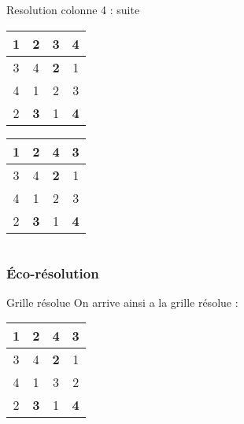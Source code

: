 \begin{frame}
\begin{columns}
   \pause  
  \begin{column}{5cm}
  \begin{block}{Resolution colonne 4 : suite}
	\begin{center}
         \begin{tabular}{|c|c| |c|c| }
               \hline
               \textbf{1}&2&{\color{green} 3}&{\color{red} 4}\\
               \hline
               3&4&\textbf{2}&1\\
               \hline
               \hline
               4&1&2&3\\
               \hline
               2&\textbf{3}&1&\textbf{4}\\                      
            \hline
        \end{tabular}
    \end{center}
    \pause
    \begin{center}
         \begin{tabular}{|c|c| |c|c| }
               \hline
               \textbf{1}&2&4&3\\
               \hline
               3&4&\textbf{2}&1\\
               \hline
               \hline
               4&1&{\color{green} 2}&{\color{red} 3}\\
               \hline
               2&\textbf{3}&1&\textbf{4}\\                      
            \hline
        \end{tabular}
    \end{center}
     \end{block} 
     \end{column}
 \end{columns}  
\end{frame}


\begin{frame}
    \frametitle{Éco-résolution}
    \begin{block}{Grille résolue}
    	On arrive ainsi a la grille résolue :
    	\begin{center}
         \begin{tabular}{|c|c| |c|c| }
               \hline
               \textbf{1}&2&4&3\\
               \hline
               3&4&\textbf{2}&1\\
               \hline
               \hline
               4&1&3&2\\
               \hline
               2&\textbf{3}&1&\textbf{4}\\                      
            \hline
        \end{tabular}
    \end{center}
    \end{block}
\end{frame}
